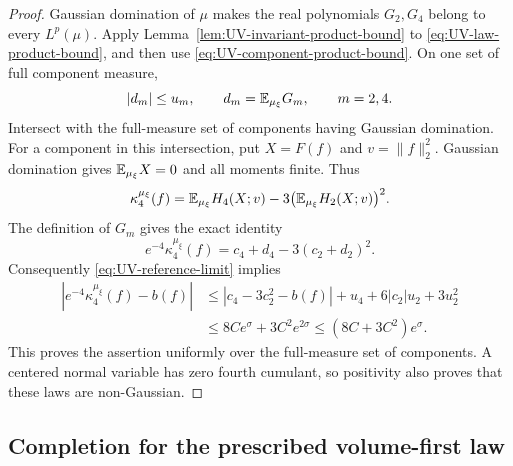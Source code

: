 \begin{proof}
Gaussian domination of $\mu$ makes the real polynomials $G_2,G_4$
belong to every $L^p(\mu)$. Apply
Lemma~\ref{lem:UV-invariant-product-bound} to
\eqref{eq:UV-law-product-bound}, and then use
\eqref{eq:UV-component-product-bound}. On one set of full
component measure,
\[
 |d_m|\le u_m,\qquad d_m=\mathbb E_{\mu_\xi}G_m,\qquad m=2,4.
\]
Intersect with the full-measure set of components having Gaussian
domination. For a component in this intersection, put $X=F(f)$
and $v=\|f\|_2^2$. Gaussian domination gives $\mathbb E_{\mu_\xi}X=0$
and all moments finite. Thus
\[
 \kappa_4^{\mu_\xi}(f)
  =\mathbb E_{\mu_\xi}H_4(X;v)
          -3\bigl(\mathbb E_{\mu_\xi}H_2(X;v)\bigr)^2.
\]
The definition of $G_m$ gives the exact identity
\begin{equation}\label{eq:UV-cumulant-identity}
 e^{-4}\kappa_4^{\mu_\xi}(f)
                =c_4+d_4-3(c_2+d_2)^2.
\end{equation}
Consequently \eqref{eq:UV-reference-limit} implies
\begin{align*}
 |e^{-4}\kappa_4^{\mu_\xi}(f)-b(f)|
 &\le |c_4-3c_2^2-b(f)|+u_4+6|c_2|u_2+3u_2^2\\
 &\le8Ce^\sigma+3C^2e^{2\sigma}
 \le(8C+3C^2)e^\sigma.
\end{align*}
This proves the assertion uniformly over the full-measure set
of components. A centered normal variable has zero fourth
cumulant, so positivity also proves that these laws are
non-Gaussian.
\end{proof}




\subsection{Completion for the prescribed volume-first law}

